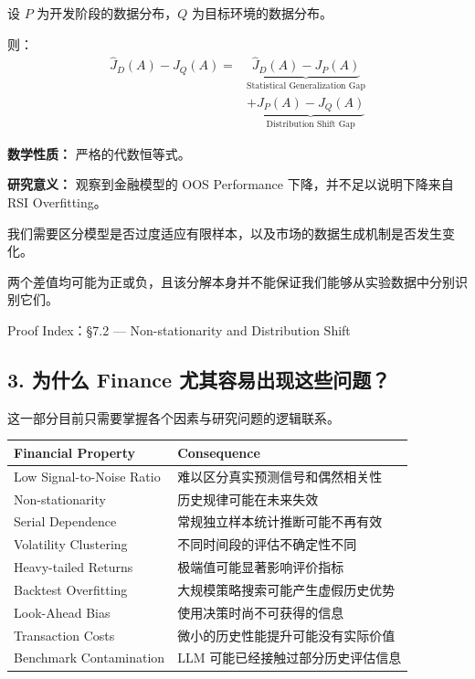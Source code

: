 设 \(P\) 为开发阶段的数据分布，\(Q\) 为目标环境的数据分布。

则：
\[\boxed{
\begin{aligned}
\widehat J_D(A)-J_Q(A)
={}&
\underbrace{
\widehat J_D(A)-J_P(A)
}_{\text{Statistical Generalization Gap}}\\
&+
\underbrace{
J_P(A)-J_Q(A)
}_{\text{Distribution Shift Gap}}
\end{aligned}
}\]

\textbf{数学性质：} 严格的代数恒等式。

\textbf{研究意义：} 观察到金融模型的 OOS Performance 下降，并不足以说明下降来自 RSI Overfitting。

我们需要区分模型是否过度适应有限样本，以及市场的数据生成机制是否发生变化。

两个差值均可能为正或负，且该分解本身并不能保证我们能够从实验数据中分别识别它们。

Proof Index：§7.2 --- Non-stationarity and Distribution Shift

\hypertarget{part-1-10-0001-ux4e3aux4ec0ux4e48-finance-ux5c24ux5176ux5bb9ux6613ux51faux73b0ux8fd9ux4e9bux95eeux9898}{%
\subsection{3. 为什么 Finance 尤其容易出现这些问题？}\label{part-1-10-0001-ux4e3aux4ec0ux4e48-finance-ux5c24ux5176ux5bb9ux6613ux51faux73b0ux8fd9ux4e9bux95eeux9898}}

这一部分目前只需要掌握各个因素与研究问题的逻辑联系。

\begin{readertable}
\begin{longtable}[]{@{}
  >{\raggedright\arraybackslash}p{}
  >{\raggedright\arraybackslash}p{}@{}}
\toprule
Financial Property & Consequence \\
\midrule
\endhead
Low Signal-to-Noise Ratio & 难以区分真实预测信号和偶然相关性 \\
Non-stationarity & 历史规律可能在未来失效 \\
Serial Dependence & 常规独立样本统计推断可能不再有效 \\
Volatility Clustering & 不同时间段的评估不确定性不同 \\
Heavy-tailed Returns & 极端值可能显著影响评价指标 \\
Backtest Overfitting & 大规模策略搜索可能产生虚假历史优势 \\
Look-Ahead Bias & 使用决策时尚不可获得的信息 \\
Transaction Costs & 微小的历史性能提升可能没有实际价值 \\
Benchmark Contamination & LLM 可能已经接触过部分历史评估信息 \\
\bottomrule
\end{longtable}
\end{readertable}

